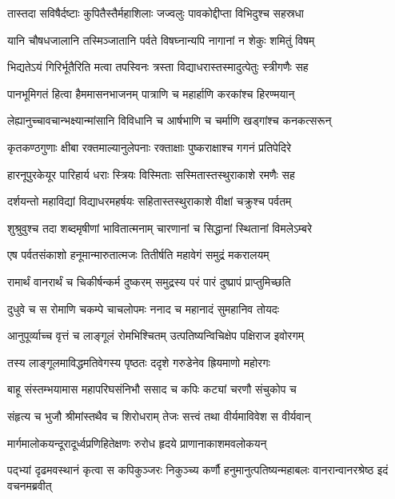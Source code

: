 \twolineshloka
{तास्तदा सविषैर्दष्टाः कुपितैस्तैर्महाशिलाः}
{जज्वलुः पावकोद्दीप्ता विभिदुश्च सहस्रधा} %

\twolineshloka
{यानि चौषधजालानि तस्मिञ्जातानि पर्वते}
{विषघ्नान्यपि नागानां न शेकुः शमितुं विषम्} %

\twolineshloka
{भिद्यतेऽयं गिरिर्भूतैरिति मत्वा तपस्विनः}
{त्रस्ता विद्याधरास्तस्मादुत्पेतुः स्त्रीगणैः सह} %

\twolineshloka
{पानभूमिगतं हित्वा हैममासनभाजनम्}
{पात्राणि च महार्हाणि करकांश्च हिरण्मयान्} %

\twolineshloka
{लेह्यानुच्चावचान्भक्ष्यान्मांसानि विविधानि च}
{आर्षभाणि च चर्माणि खड्गांश्च कनकत्सरून्} %

\twolineshloka
{कृतकण्ठगुणाः क्षीबा रक्तमाल्यानुलेपनाः}
{रक्ताक्षाः पुष्कराक्षाश्च गगनं प्रतिपेदिरे} %

\twolineshloka
{हारनूपुरकेयूर पारिहार्य धराः स्त्रियः}
{विस्मिताः सस्मितास्तस्थुराकाशे रमणैः सह} %

\twolineshloka
{दर्शयन्तो महाविद्यां विद्याधरमहर्षयः}
{सहितास्तस्थुराकाशे वीक्षां चक्रुश्च पर्वतम्} %

\twolineshloka
{शुश्रुवुश्च तदा शब्दमृषीणां भावितात्मनाम्}
{चारणानां च सिद्धानां स्थितानां विमलेऽम्बरे} %

\twolineshloka
{एष पर्वतसंकाशो हनूमान्मारुतात्मजः}
{तितीर्षति महावेगं समुद्रं मकरालयम्} %

\twolineshloka
{रामार्थं वानरार्थं च चिकीर्षन्कर्म दुष्करम्}
{समुद्रस्य परं पारं दुष्प्रापं प्राप्तुमिच्छति} %

\twolineshloka
{दुधुवे च स रोमाणि चकम्पे चाचलोपमः}
{ननाद च महानादं सुमहानिव तोयदः} %

\twolineshloka
{आनुपूर्व्याच्च वृत्तं च लाङ्गूलं रोमभिश्चितम्}
{उत्पतिष्यन्विचिक्षेप पक्षिराज इवोरगम्} %

\twolineshloka
{तस्य लाङ्गूलमाविद्धमतिवेगस्य पृष्ठतः}
{ददृशे गरुडेनेव ह्रियमाणो महोरगः} %

\twolineshloka
{बाहू संस्तम्भयामास महापरिघसंनिभौ}
{ससाद च कपिः कट्यां चरणौ संचुकोप च} %

\twolineshloka
{संहृत्य च भुजौ श्रीमांस्तथैव च शिरोधराम्}
{तेजः सत्त्वं तथा वीर्यमाविवेश स वीर्यवान्} %

\twolineshloka
{मार्गमालोकयन्दूरादूर्ध्वप्रणिहितेक्षणः}
{रुरोध हृदये प्राणानाकाशमवलोकयन्} %

\threelineshloka
{पद्भ्यां दृढमवस्थानं कृत्वा स कपिकुञ्जरः}
{निकुञ्च्य कर्णौ हनुमानुत्पतिष्यन्महाबलः}
{वानरान्वानरश्रेष्ठ इदं वचनमब्रवीत्} %

